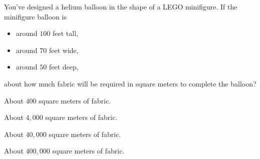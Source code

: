 \documentclass{ximera}
\begin{document}
\begin{exercise}
You've designed a helium balloon in the shape of a
LEGO minifigure. If the minifigure balloon is
\begin{itemize}
\item around $100$ feet tall,
\item around $70$ feet wide,
\item around $50$ feet deep, 
\end{itemize}
about how much fabric will be required in square meters to complete
the balloon?
\begin{enumerate}\begin{multicols}{2}
  \item About $400$ square meters of fabric.
  \item About $4,000$ square meters of fabric.
  \item About $40,000$ square meters of fabric.
  \item About $400,000$ square meters of fabric.
  \end{multicols}
\end{enumerate}
\end{exercise}






\end{document}
